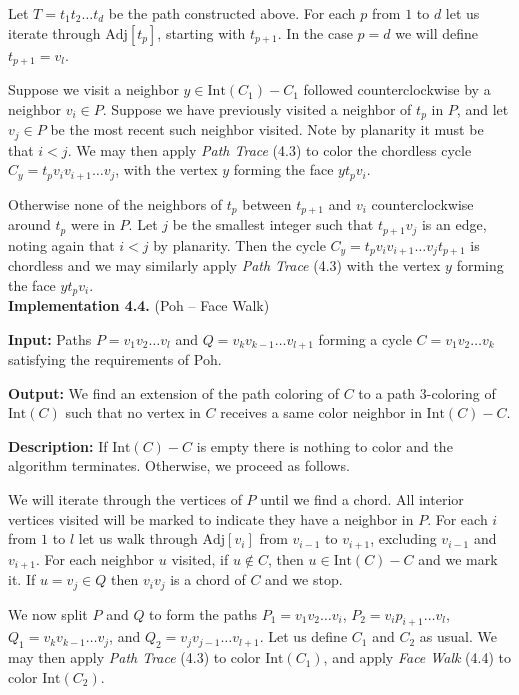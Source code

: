 \documentclass[letterpaper, 12pt]{amsart}
\theoremstyle{definition}
\theoremstyle{definition}
\theoremstyle{thm}
\theoremstyle{definition}
\begin{document}
Let $T=t_1t_2\ldots t_d$ be the path constructed above.
For each $p$ from $1$ to $d$ let us iterate through
$\text{Adj}[t_p]$, starting with $t_{p+1}$. In the case $p=d$ we will define
$t_{p+1}=v_l$.

Suppose
we visit a neighbor $y\in \text{Int}(C_1)-C_1$ followed counterclockwise by a neighbor $v_i\in P$.
Suppose we have previously visited a neighbor of $t_p$ in $P$, and let $v_j\in P$
be the most recent such neighbor visited. Note by planarity it must be that $i<j$.
We may then apply \textit{Path Trace} (4.3) to color the chordless cycle
$C_y=t_pv_iv_{i+1}\ldots v_j$, with the vertex $y$ forming the face $yt_pv_i$.

Otherwise none of the neighbors of $t_p$ between $t_{p+1}$ and
$v_i$ counterclockwise around $t_p$ were in $P$. Let
$j$ be the smallest integer such that $t_{p+1}v_j$ is an edge, noting again
that $i<j$ by planarity. Then the cycle $C_y=t_pv_iv_{i+1}\ldots v_jt_{p+1}$ is
chordless and we may similarly apply \textit{Path Trace} (4.3) with the vertex
$y$ forming the face $yt_pv_i$.\\

\noindent\textbf{Implementation 4.4.} (Poh -- Face Walk)

\noindent\textbf{Input:} Paths $P=v_1v_2\ldots v_l$ and
$Q=v_kv_{k-1}\ldots v_{l+1}$ forming a cycle $C=v_1v_2\ldots v_k$ satisfying
the requirements of Poh.

\noindent\textbf{Output:} We find an extension of the path coloring of $C$ to
a path $3$-coloring of $\text{Int}(C)$ such that
no vertex in $C$ receives a same color neighbor in $\text{Int}(C)-C$.

\noindent\textbf{Description:} If $\text{Int}(C)-C$ is empty there is nothing to
color and the algorithm terminates. Otherwise, we proceed as follows.

We will iterate through the vertices of $P$ until we find a chord. All interior
vertices visited will be marked to indicate they have a neighbor in $P$. For
each $i$ from $1$ to $l$ let us walk through
$\text{Adj}[v_i]$ from $v_{i-1}$ to $v_{i+1}$, excluding
$v_{i-1}$ and $v_{i+1}$. For each neighbor $u$ visited,
if $u\not\in C$, then $u\in \text{Int}(C)-C$ and we
mark it. If $u=v_j\in Q$ then $v_iv_j$ is a chord of $C$ and we stop.

We now split $P$ and $Q$ to form the paths
$P_1=v_1v_2\ldots v_i$, $P_2=v_ip_{i+1}\ldots v_l$, $Q_1=v_kv_{k-1}\ldots v_j$,
and $Q_2=v_jv_{j-1}\ldots v_{l+1}$. Let us define $C_1$ and $C_2$ as usual.
We may then apply \textit{Path Trace} (4.3) to color $\text{Int}(C_1)$, and
apply \textit{Face Walk} (4.4) to color $\text{Int}(C_2)$.
\end{document}
